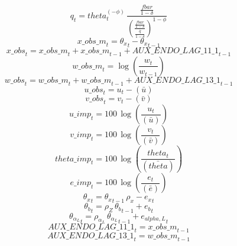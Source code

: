 \begin{dmath}
{{q}}_{t}={{theta}}_{t}^{\left(-{\phi}\right)}\, \frac{\frac{{fbar}}{1-{{\delta}}}}{\left(\frac{\frac{{fbar}}{1-{{\delta}}}}{\frac{{{\overline{q}}}}{1-{{\delta}}}}\right)^{1-{\phi}}}
\end{dmath}
\begin{dmath}
{x\_obs\_m}_{t}={{\theta_x}}_{t}-{{\theta_x}}_{t-1}
\end{dmath}
\begin{dmath}
{x\_obs}_{t}={x\_obs\_m}_{t}+{x\_obs\_m}_{t-1}+{AUX\_ENDO\_LAG\_11\_1}_{t-1}
\end{dmath}
\begin{dmath}
{w\_obs\_m}_{t}=\log\left(\frac{{{w}}_{t}}{{{w}}_{t-1}}\right)
\end{dmath}
\begin{dmath}
{w\_obs}_{t}={w\_obs\_m}_{t}+{w\_obs\_m}_{t-1}+{AUX\_ENDO\_LAG\_13\_1}_{t-1}
\end{dmath}
\begin{dmath}
{u\_obs}_{t}={{u}}_{t}-(\bar{{u}})
\end{dmath}
\begin{dmath}
{v\_obs}_{t}={{v}}_{t}-(\bar{{v}})
\end{dmath}
\begin{dmath}
{u\_imp}_{t}=100\, \log\left(\frac{{{u}}_{t}}{(\bar{{u}})}\right)
\end{dmath}
\begin{dmath}
{v\_imp}_{t}=100\, \log\left(\frac{{{v}}_{t}}{(\bar{{v}})}\right)
\end{dmath}
\begin{dmath}
{theta\_imp}_{t}=100\, \log\left(\frac{{{theta}}_{t}}{(\bar{{theta}})}\right)
\end{dmath}
\begin{dmath}
{e\_imp}_{t}=100\, \log\left(\frac{{{e}}_{t}}{(\bar{{e}})}\right)
\end{dmath}
\begin{dmath}
{{\theta_x}}_{t}={{\theta_x}}_{t-1}\, {{\rho_x}}-{{e_x}}_{t}
\end{dmath}
\begin{dmath}
{{\theta_b}}_{t}={{\rho_Z}}\, {{\theta_b}}_{t-1}+{{e_{b}}}_{t}
\end{dmath}
\begin{dmath}
{{\theta_{\alpha_L}}}_{t}={{\rho_{\alpha_L}}}\, {{\theta_{\alpha_L}}}_{t-1}+{{e_{alpha,L}}}_{t}
\end{dmath}
\begin{dmath}
{AUX\_ENDO\_LAG\_11\_1}_{t}={x\_obs\_m}_{t-1}
\end{dmath}
\begin{dmath}
{AUX\_ENDO\_LAG\_13\_1}_{t}={w\_obs\_m}_{t-1}
\end{dmath}
